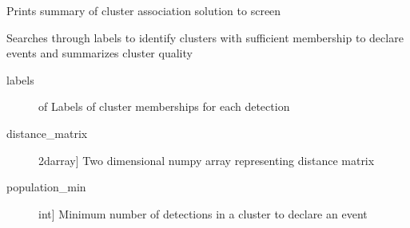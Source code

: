 \documentclass[letterpaper,10pt,english]{sphinxmanual}
\begin{document}

\begin{fulllineitems}
\label{\detokenize{infrapy.association:infrapy.association.hjl.summarize_clusters}}
Prints summary of cluster association solution to screen

Searches through labels to identify clusters with sufficient
membership to declare events and summarizes cluster quality
\begin{description}
\item[{labels}] \leavevmode{[} of \sphinxcode{\sphinxupquote{int}}{]}
Labels of cluster memberships for each detection

\item[{distance\_matrix}] \leavevmode{[}2darray{]}
Two dimensional numpy array representing distance matrix

\item[{population\_min}] \leavevmode{[}int{]}
Minimum number of detections in a cluster to declare an event

\end{description}

\end{fulllineitems}

\end{document}
